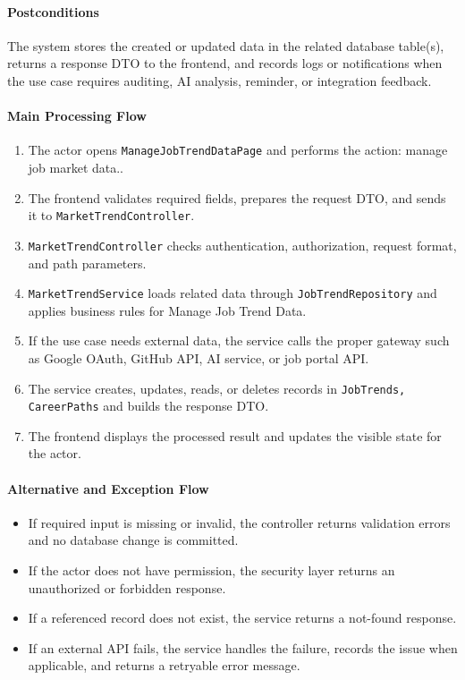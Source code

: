 \paragraph{Postconditions}

The system stores the created or updated data in the related database table(s), returns a response DTO to the frontend, and records logs or notifications when the use case requires auditing, AI analysis, reminder, or integration feedback.

\paragraph{Main Processing Flow}

\begin{enumerate}
    \item The actor opens \texttt{ManageJobTrendDataPage} and performs the action: manage job market data..
    \item The frontend validates required fields, prepares the request DTO, and sends it to \texttt{MarketTrendController}.
    \item \texttt{MarketTrendController} checks authentication, authorization, request format, and path parameters.
    \item \texttt{MarketTrendService} loads related data through \texttt{JobTrendRepository} and applies business rules for Manage Job Trend Data.
    \item If the use case needs external data, the service calls the proper gateway such as Google OAuth, GitHub API, AI service, or job portal API.
    \item The service creates, updates, reads, or deletes records in \texttt{JobTrends, CareerPaths} and builds the response DTO.
    \item The frontend displays the processed result and updates the visible state for the actor.
\end{enumerate}

\paragraph{Alternative and Exception Flow}

\begin{itemize}
    \item If required input is missing or invalid, the controller returns validation errors and no database change is committed.
    \item If the actor does not have permission, the security layer returns an unauthorized or forbidden response.
    \item If a referenced record does not exist, the service returns a not-found response.
    \item If an external API fails, the service handles the failure, records the issue when applicable, and returns a retryable error message.
\end{itemize}

